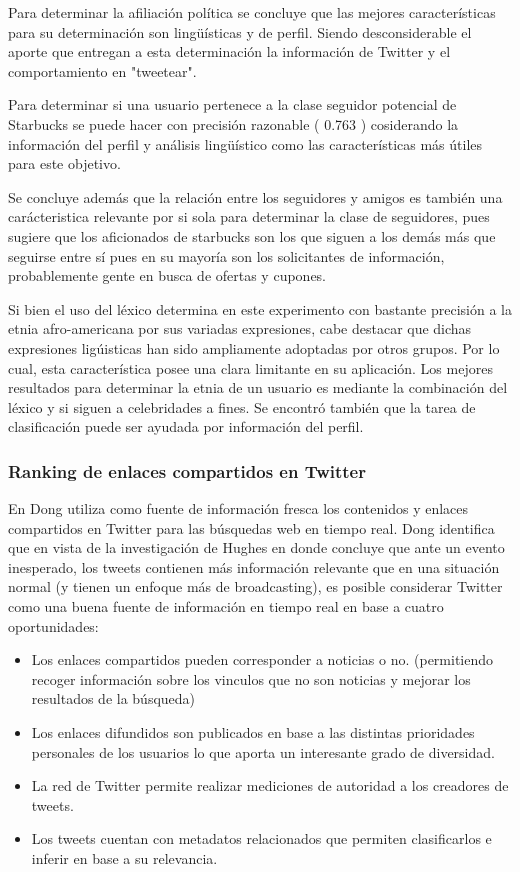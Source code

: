     Para determinar la afiliación política se concluye que las mejores características para su determinación son
    lingüísticas y de perfil. Siendo desconsiderable el aporte que entregan a esta determinación la información de Twitter
    y el comportamiento en "tweetear".

    Para determinar si una usuario pertenece a la clase seguidor potencial de Starbucks se puede hacer con precisión
    razonable ( 0.763 ) cosiderando la información del perfil y análisis lingüístico como las características más útiles
    para este objetivo.

    Se concluye además que la relación entre los seguidores y amigos es también una carácteristica relevante por si sola
    para determinar la clase de seguidores, pues sugiere que los aficionados de starbucks son los que siguen a los demás
    más que seguirse entre sí pues en su mayoría son los solicitantes de información, probablemente gente en busca de
    ofertas y cupones.

    Si bien el uso del léxico determina en este experimento con bastante precisión a la etnia afro-americana por sus
    variadas expresiones, cabe destacar que dichas expresiones ligúisticas han sido ampliamente adoptadas por otros grupos.
    Por lo cual, esta característica posee una clara limitante en su aplicación. Los mejores resultados para determinar la
    etnia de un usuario es mediante la combinación del léxico y si siguen a celebridades a fines. Se encontró también que 
    la tarea de clasificación puede ser ayudada por información del perfil.
  
 \subsubsection{Ranking de enlaces compartidos en Twitter}
  
  En \cite{Dong:2010:TEI:1772690.1772725} Dong utiliza como fuente de información fresca los contenidos y enlaces compartidos en Twitter para las búsquedas web en tiempo real. Dong identifica que en vista de la investigación de  Hughes en \cite{hughes2009twitter} donde concluye que ante un evento inesperado, los tweets contienen más información relevante que en una situación normal (y tienen un enfoque más de broadcasting), es posible considerar Twitter como una buena fuente de información en tiempo real en base a cuatro oportunidades:
  
  \begin{itemize}
	\item Los enlaces compartidos pueden corresponder a noticias o no. (permitiendo recoger información sobre los vinculos que no son noticias y mejorar los resultados de la búsqueda)
	\item Los enlaces difundidos son publicados en base a las distintas prioridades personales de los usuarios lo que aporta un interesante grado de diversidad.
	\item La red de Twitter permite realizar mediciones de autoridad a los creadores de tweets.
	\item Los tweets cuentan con metadatos relacionados que permiten clasificarlos e inferir en base a su relevancia.
  \end{itemize}
  

